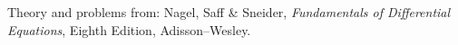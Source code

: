 \documentclass[11pt]{article}
\begin{document}
% 











\LabSolutions


Theory and problems from: Nagel, Saff \& Sneider, \textit{Fundamentals of Differential Equations}, Eighth Edition, Adisson--Wesley.
\end{document}
